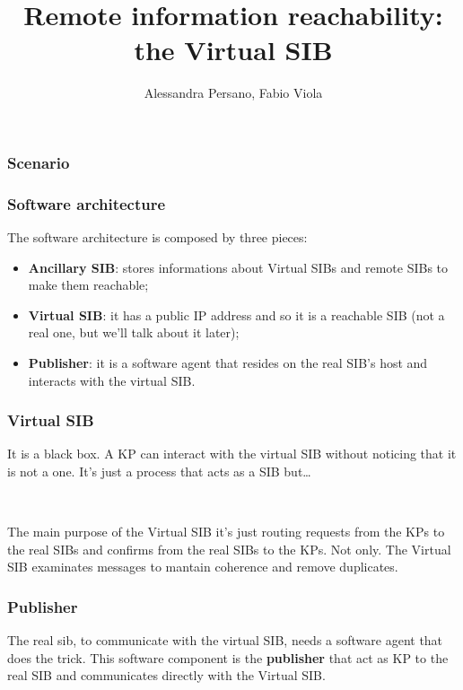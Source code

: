 \documentclass[10pt]{beamer}
\title{Remote information reachability: the Virtual SIB}
\author{Alessandra Persano, Fabio Viola}
\date{}
\begin{document}
\begin{frame}
\frametitle{Scenario}
\end{frame}

\begin{frame}
\frametitle{Software architecture}

The software architecture is composed by three pieces:

\begin{itemize}
\item {\bf Ancillary SIB}: stores informations about Virtual SIBs and
  remote SIBs to make them reachable;

\item {\bf Virtual SIB}: it has a public IP address and so it is a
  reachable SIB (not a real one, but we'll talk about it later);

\item {\bf Publisher}: it is a software agent that resides on the real
  SIB's host and interacts with the virtual SIB.
\end{itemize}

\end{frame}

\begin{frame}
\frametitle{Virtual SIB}

It is a black box. A KP can interact with the virtual SIB without
noticing that it is not a one. It's just a process that acts as a SIB but\dots

\

The main purpose of the Virtual SIB it's just routing requests from
the KPs to the real SIBs and confirms from the real SIBs to the
KPs. Not only. The Virtual SIB examinates messages to mantain
coherence and remove duplicates.

\end{frame}

\begin{frame}[fragile]
\frametitle{Publisher}

The real sib, to communicate with the virtual SIB, needs a software
agent that does the trick. This software component is the {\bf
  publisher} that act as KP to the real SIB and communicates directly
with the Virtual SIB. 

\end{frame}
\end{document}
